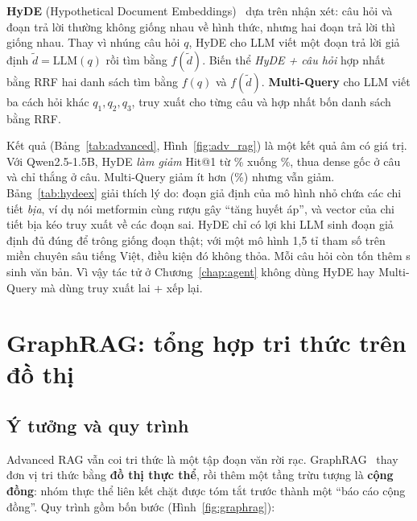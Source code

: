 \textbf{HyDE} (Hypothetical Document Embeddings)~\cite{gao2023hyde} dựa trên nhận xét: câu hỏi và đoạn trả lời
thường không giống nhau về hình thức, nhưng hai đoạn trả lời thì giống nhau. Thay vì nhúng câu hỏi $q$, HyDE cho
LLM viết một đoạn trả lời giả định $\tilde{d} = \mathrm{LLM}(q)$ rồi tìm bằng $f(\tilde{d})$. Biến thể
\emph{HyDE + câu hỏi} hợp nhất bằng RRF hai danh sách tìm bằng $f(q)$ và $f(\tilde d)$.
\textbf{Multi-Query} cho LLM viết ba cách hỏi khác $q_1, q_2, q_3$, truy xuất cho từng câu và hợp nhất bốn danh
sách bằng RRF.



Kết quả (Bảng~\ref{tab:advanced}, Hình~\ref{fig:adv_rag}) là một kết quả âm có giá trị. Với Qwen2.5-1.5B, HyDE
\emph{làm giảm} Hit@1 từ \% xuống \%, thua dense gốc
ở  câu và chỉ thắng ở  câu.
Multi-Query giảm ít hơn (\%) nhưng vẫn giảm. Bảng~\ref{tab:hydeex} giải thích
lý do: đoạn giả định của mô hình nhỏ chứa các chi tiết \emph{bịa}, ví dụ nói metformin cùng rượu gây ``tăng huyết
áp'', và vector của chi tiết bịa kéo truy xuất về các đoạn sai. HyDE chỉ có lợi khi LLM sinh đoạn giả định đủ đúng
để trông giống đoạn thật; với một mô hình 1,5 tỉ tham số trên miền chuyên sâu tiếng Việt, điều kiện đó không thỏa.
Mỗi câu hỏi còn tốn thêm  s sinh văn bản. Vì vậy tác tử ở Chương~\ref{chap:agent} không
dùng HyDE hay Multi-Query mà dùng truy xuất lai + xếp lại.


\section{GraphRAG: tổng hợp tri thức trên đồ thị}
\subsection{Ý tưởng và quy trình}
Advanced RAG vẫn coi tri thức là một tập đoạn văn rời rạc. GraphRAG~\cite{edge2024graphrag} thay đơn vị tri thức
bằng \textbf{đồ thị thực thể}, rồi thêm một tầng trừu tượng là \textbf{cộng đồng}: nhóm thực thể liên kết chặt
được tóm tắt trước thành một ``báo cáo cộng đồng''. Quy trình gồm bốn bước (Hình~\ref{fig:graphrag}):

